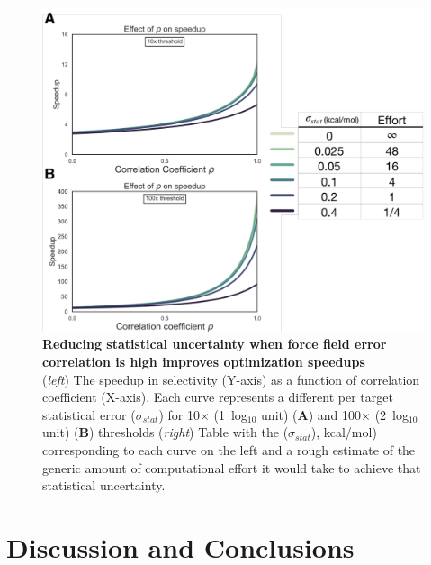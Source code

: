 \documentclass[phd,tocprelim]{cornell}
\begin{document}
\begin{landscape}
\begin{figure}
\centering
\includegraphics[width=0.6\linewidth]{figures/figure6.pdf}
\caption[Reducing statistical uncertainty when force field error correlation is high improves optimization speedups]{
{\bf Reducing statistical uncertainty when force field error correlation is high improves optimization speedups} \\
(\emph{left}) The speedup in selectivity (Y-axis) as a function of correlation coefficient (X-axis). Each curve represents a different per target statistical error ($\sigma_{stat}$) for 10$\times$ (1~log$_{10}$ unit) ({\bf A}) and 100$\times$ (2~log$_{10}$ unit) ({\bf B}) thresholds (\emph{right}) Table with the ($\sigma_{stat}$), kcal/mol) corresponding to each curve on the left and a rough estimate of the generic amount of computational effort it would take to achieve that statistical uncertainty. 
\label{fig:figure-6}
}
\end{figure}
\end{landscape}


\section{Discussion and Conclusions}
\end{document}
